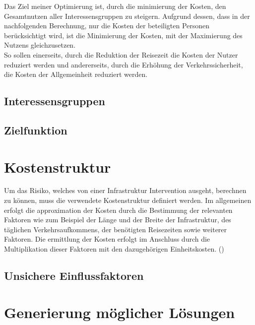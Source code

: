 Das Ziel meiner Optimierung ist, durch die minimierung der Kosten, den Gesamtnutzen aller Interessensgruppen zu steigern. Aufgrund dessen, dass in der nachfolgenden Berechnung, nur die Kosten der beteiligten Personen berücksichtigt wird, ist die Minimierung der Kosten, mit der Maximierung des Nutzens gleichzusetzen. \\
So sollen einerseits, durch die Reduktion der Reisezeit die Kosten der Nutzer reduziert werden und andererseits, durch die Erhöhung der Verkehrssicherheit, die Kosten der Allgemeinheit reduziert werden. 



	\subsection{Interessensgruppen}
	

	\subsection{Zielfunktion}
	
	

\section{Kostenstruktur}
\label{sec:Kostenstruktur}

Um das Risiko, welches von einer Infrastruktur Intervention ausgeht, berechnen zu können, muss die verwendete Kostenstruktur definiert werden. 
Im allgemeinen erfolgt die approximation der Kosten durch die Bestimmung der relevanten Faktoren wie zum Beispiel der Länge und der Breite der Infrastruktur, des täglichen Verkehrsaufkommens, der benötigten Reisezeiten sowie weiterer Faktoren. Die ermittlung der Kosten erfolgt im Anschluss durch die Multiplikation dieser Faktoren mit den dazugehörigen Einheitskosten. (\cite{Adey2012}) 


	
	
	\subsection{Unsichere Einflussfaktoren}
	\label{subsec:Uncertain}
	



\section{Generierung möglicher Lösungen}
\label{sec:Varianten}


